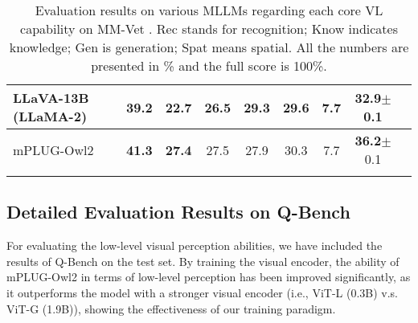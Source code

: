 \documentclass[10pt,twocolumn,letterpaper]{article}
\newlength\savewidth
\newcommand\shline{\noalign{\global\savewidth\arrayrulewidth\global\arrayrulewidth 1pt}\hline\noalign{\global\arrayrulewidth\savewidth}}
\newcommand{\modelname}{mPLUG-Owl2\xspace}
\begin{document}
\begin{table*}[t]
\begin{tabular}{lcccccccc}
        LLaVA-13B (LLaMA-2) \cite{Liu2023Llava} &  39.2 &  22.7 &  26.5 &  29.3 & 29.6 & 7.7 &  32.9$\pm$0.1 \\
        \hline
        \modelname &  \textbf{41.3} &  \textbf{27.4} &  27.5 & 27.9 & 30.3 & 7.7 &  \textbf{36.2}$\pm$0.1 \\
        \shline
    \end{tabular}
    \caption{Evaluation results on various MLLMs regarding each core VL capability on MM-Vet \cite{yu2023mmvet}. Rec stands for recognition; Know indicates knowledge; Gen is generation; Spat means spatial. All the numbers are presented in \% and the full score is 100\%.}
    \label{tab:mmvet_benchmark}
\end{table*}


\subsection{Detailed Evaluation Results on Q-Bench}
For evaluating the low-level visual perception abilities, we have included the results of Q-Bench \cite{wu2023qbench} on the test set. By training the visual encoder, the ability of \modelname in terms of low-level perception has been improved significantly, as it outperforms the model with a stronger visual encoder (i.e., ViT-L (0.3B) v.s. ViT-G (1.9B)), showing the effectiveness of our training paradigm.
\end{document}
